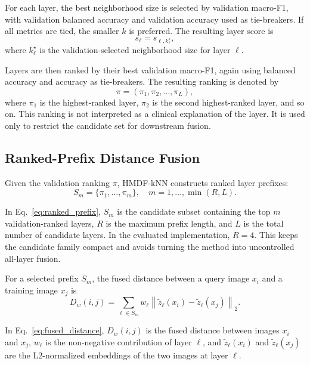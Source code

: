 \documentclass[main.tex]{subfiles}
\begin{document}
For each layer, the best neighborhood size is selected by validation macro-F1, with validation balanced accuracy and validation accuracy used as tie-breakers. If all metrics are tied, the smaller \(k\) is preferred. The resulting layer score is
\begin{equation}
  s_{\ell} = s_{\ell,k_{\ell}^{\star}},
\end{equation}
where \(k_{\ell}^{\star}\) is the validation-selected neighborhood size for layer \(\ell\).

Layers are then ranked by their best validation macro-F1, again using balanced accuracy and accuracy as tie-breakers. The resulting ranking is denoted by
\begin{equation}
  \pi = (\pi_1,\pi_2,\ldots,\pi_L),
\end{equation}
where \(\pi_1\) is the highest-ranked layer, \(\pi_2\) is the second highest-ranked layer, and so on. This ranking is not interpreted as a clinical explanation of the layer. It is used only to restrict the candidate set for downstream fusion.

\subsection{Ranked-Prefix Distance Fusion}

Given the validation ranking \(\pi\), HMDF-kNN constructs ranked layer prefixes:
\begin{equation}
  S_m = \{\pi_1,\ldots,\pi_m\},
  \quad
  m=1,\ldots,\min(R,L).
  \label{eq:ranked_prefix}
\end{equation}

In Eq.~\eqref{eq:ranked_prefix}, \(S_m\) is the candidate subset containing the top \(m\) validation-ranked layers, \(R\) is the maximum prefix length, and \(L\) is the total number of candidate layers. In the evaluated implementation, \(R=4\). This keeps the candidate family compact and avoids turning the method into uncontrolled all-layer fusion.

For a selected prefix \(S_m\), the fused distance between a query image \(x_i\) and a training image \(x_j\) is
\begin{equation}
  D_w(i,j)
  =
  \sum_{\ell\in S_m}
  w_{\ell}
  \left\|
  \tilde{z}_{\ell}(x_i)
  -
  \tilde{z}_{\ell}(x_j)
  \right\|_2 .
  \label{eq:fused_distance}
\end{equation}

In Eq.~\eqref{eq:fused_distance}, \(D_w(i,j)\) is the fused distance between images \(x_i\) and \(x_j\), \(w_{\ell}\) is the non-negative contribution of layer \(\ell\), and \(\tilde{z}_{\ell}(x_i)\) and \(\tilde{z}_{\ell}(x_j)\) are the L2-normalized embeddings of the two images at layer \(\ell\).
\end{document}
